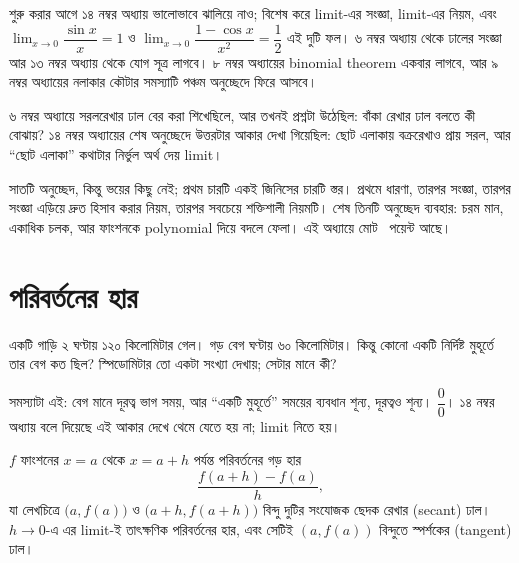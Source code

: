 \documentclass[11pt]{article}
\begin{document}

\noindent
শুরু করার আগে ১৪ নম্বর অধ্যায় ভালোভাবে ঝালিয়ে নাও; বিশেষ করে limit-এর
সংজ্ঞা, limit-এর নিয়ম, এবং $\lim_{x \to 0} \dfrac{\sin x}{x} = 1$ ও
$\lim_{x \to 0} \dfrac{1-\cos x}{x^{2}} = \dfrac{1}{2}$ এই দুটি ফল। ৬ নম্বর
অধ্যায় থেকে ঢালের সংজ্ঞা আর ১৩ নম্বর অধ্যায় থেকে যোগ সূত্র লাগবে।
৮ নম্বর অধ্যায়ের binomial theorem একবার লাগবে, আর ৯ নম্বর অধ্যায়ের
নলাকার কৌটার সমস্যাটি পঞ্চম অনুচ্ছেদে ফিরে আসবে।

৬ নম্বর অধ্যায়ে সরলরেখার ঢাল বের করা শিখেছিলে, আর তখনই প্রশ্নটা উঠেছিল:
বাঁকা রেখার ঢাল বলতে কী বোঝায়? ১৪ নম্বর অধ্যায়ের শেষ অনুচ্ছেদে উত্তরটার
আকার দেখা গিয়েছিল: ছোট এলাকায় বক্ররেখাও প্রায় সরল, আর ``ছোট এলাকা'' কথাটার
নির্ভুল অর্থ দেয় limit।

সাতটি অনুচ্ছেদ, কিন্তু ভয়ের কিছু নেই; প্রথম চারটি একই জিনিসের চারটি স্তর।
প্রথমে ধারণা, তারপর সংজ্ঞা, তারপর সংজ্ঞা এড়িয়ে দ্রুত হিসাব করার নিয়ম, তারপর
সবচেয়ে শক্তিশালী নিয়মটি। শেষ তিনটি অনুচ্ছেদ ব্যবহার: চরম মান, একাধিক চলক, আর
ফাংশনকে polynomial দিয়ে বদলে ফেলা। এই অধ্যায়ে মোট \totalpoints\ পয়েন্ট
আছে।

\section{পরিবর্তনের হার}

একটি গাড়ি ২ ঘণ্টায় ১২০ কিলোমিটার গেল। গড় বেগ ঘণ্টায় ৬০ কিলোমিটার। কিন্তু
কোনো একটি নির্দিষ্ট মুহূর্তে তার বেগ কত ছিল? স্পিডোমিটার তো একটা সংখ্যা দেখায়;
সেটার মানে কী?

সমস্যাটা এই: বেগ মানে দূরত্ব ভাগ সময়, আর ``একটি মুহূর্তে'' সময়ের ব্যবধান
শূন্য, দূরত্বও শূন্য। $\dfrac{0}{0}$। ১৪ নম্বর অধ্যায় বলে দিয়েছে এই আকার
দেখে থেমে যেতে হয় না; limit নিতে হয়।

\begin{idea}[গড় ও তাৎক্ষণিক পরিবর্তনের হার]
$f$ ফাংশনের $x = a$ থেকে $x = a+h$ পর্যন্ত পরিবর্তনের গড় হার
\[
  \frac{f(a+h) - f(a)}{h} ,
\]
যা লেখচিত্রে $\bigl( a, f(a) \bigr)$ ও $\bigl( a+h, f(a+h) \bigr)$ বিন্দু দুটির
সংযোজক ছেদক রেখার (secant) ঢাল। $h \to 0$-এ এর limit-ই তাৎক্ষণিক পরিবর্তনের
হার, এবং সেটিই $( a, f(a) )$ বিন্দুতে স্পর্শকের (tangent) ঢাল।
\end{idea}

\begin{center}
\end{center}
\end{document}
